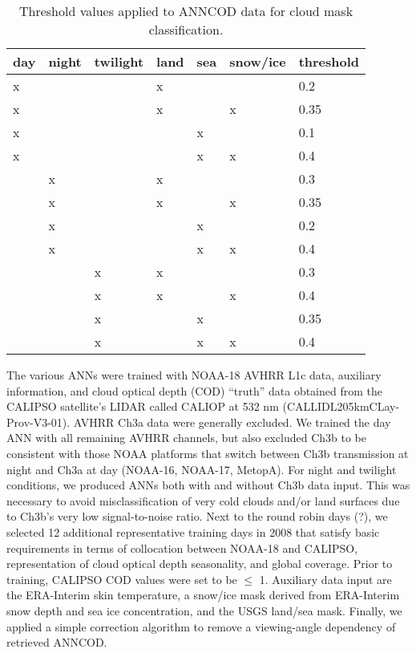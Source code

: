 \begin{table}[h]
  \caption{Threshold values applied to ANNCOD data for cloud mask classification.}
  \begin{tabular}{llllll|l} %
    \hline
    day & night & twilight & land & sea & snow/ice & threshold \\
    \hline
    x   &       &          & x    &     &          & 0.2  \\
    x   &       &          & x    &     & x        & 0.35 \\
    x   &       &          &      & x   &          & 0.1  \\
    x   &       &          &      & x   & x        & 0.4  \\ \hline
        & x     &          & x    &     &          & 0.3  \\
        & x     &          & x    &     & x        & 0.35 \\
        & x     &          &      & x   &          & 0.2  \\
        & x     &          &      & x   & x        & 0.4  \\ \hline
        &       & x        & x    &     &          & 0.3  \\
        &       & x        & x    &     & x        & 0.4  \\
        &       & x        &      & x   &          & 0.35 \\
        &       & x        &      & x   & x        & 0.4  \\ \hline
  \end{tabular}
  \label{tab:ANN_thresholds}
\end{table}

The various ANNs were trained with NOAA-18 AVHRR L1c data, auxiliary information, and cloud optical depth (COD) ``truth'' data obtained from the CALIPSO satellite's LIDAR called CALIOP at 532 nm (\mbox{CAL\textunderscore LID\textunderscore L2\textunderscore 05kmCLay-Prov-V3-01}). AVHRR Ch3a data were generally excluded. We trained the day ANN with all remaining AVHRR channels, but also excluded Ch3b to be consistent with those NOAA platforms that switch between Ch3b transmission at night and Ch3a at day (NOAA-16, NOAA-17, MetopA). For night and twilight conditions, we produced ANNs both with and without Ch3b data input. This was necessary to avoid misclassification of very cold clouds and/or land surfaces due to Ch3b's very low signal-to-noise ratio. Next to the round robin days (?), we selected 12 additional representative training days in 2008 that satisfy basic requirements in terms of collocation between NOAA-18 and CALIPSO, representation of cloud optical depth seasonality, and global coverage. Prior to training, CALIPSO COD values were set to be $\le$ 1. Auxiliary data input are the ERA-Interim skin temperature, a snow/ice mask derived from ERA-Interim snow depth and sea ice concentration, and the USGS land/sea mask. Finally, we applied a simple correction algorithm to remove a viewing-angle dependency of retrieved ANNCOD.

